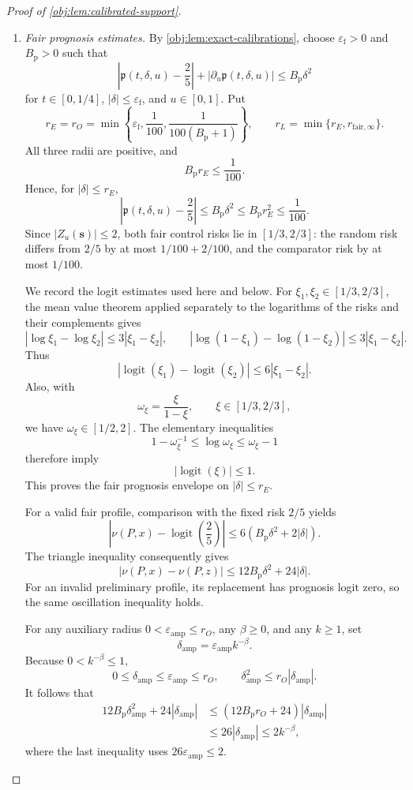 \begin{proof}[Proof of \cref{obj:lem:calibrated-support}]
\begin{enumerate}
\item \textit{Fair prognosis estimates.}
By \cref{obj:lem:exact-calibrations}, choose
\(\varepsilon_{\mathrm f}>0\) and \(B_{\mathrm p}>0\) such that
\[
\left|\mathfrak p(t,\delta,u)-\frac25\right|
+\left|\partial_u\mathfrak p(t,\delta,u)\right|
\le B_{\mathrm p}\delta^2
\]
for \(t\in[0,1/4]\), \(|\delta|\le\varepsilon_{\mathrm f}\), and \(u\in[0,1]\).
Put
\[
r_E=r_O
=\min\left\{\varepsilon_{\mathrm f},\frac1{100},
                    \frac1{100(B_{\mathrm p}+1)}\right\},
\qquad
r_L=\min\{r_E,r_{\mathrm{fair},\infty}\}.
\]
All three radii are positive, and
\[
B_{\mathrm p}r_E\le\frac1{100}.
\]
Hence, for \(|\delta|\le r_E\),
\[
\left|\mathfrak p(t,\delta,u)-\frac25\right|
\le B_{\mathrm p}\delta^2
\le B_{\mathrm p}r_E^2
\le\frac1{100}.
\]
Since \(|Z_u(\mathbf s)|\le2\), both fair control risks lie in
\([1/3,2/3]\): the random risk differs from \(2/5\) by at most
\(1/100+2/100\), and the comparator risk by at most \(1/100\).

We record the logit estimates used here and below. For
\(\xi_1,\xi_2\in[1/3,2/3]\), the mean value theorem applied separately to the logarithms of the risks and their complements gives
\[
|\log \xi_1-\log \xi_2|\le3|\xi_1-\xi_2|,
\qquad
|\log(1-\xi_1)-\log(1-\xi_2)|\le3|\xi_1-\xi_2|.
\]
Thus
\[
|\operatorname{logit}(\xi_1)-\operatorname{logit}(\xi_2)|
\le6|\xi_1-\xi_2|.
\]
Also, with
\[
\omega_\xi=\frac{\xi}{1-\xi},
\qquad \xi\in[1/3,2/3],
\]
we have \(\omega_\xi\in[1/2,2]\). The elementary inequalities
\[
1-\omega_\xi^{-1}\le\log\omega_\xi\le\omega_\xi-1
\]
therefore imply
\[
|\operatorname{logit}(\xi)|\le1.
\]
This proves the fair prognosis envelope on \(|\delta|\le r_E\).

For a valid fair profile, comparison with the fixed risk \(2/5\) yields
\[
\left|\nu(P,x)-\operatorname{logit}\!\left(\frac25\right)\right|
\le6(B_{\mathrm p}\delta^2+2|\delta|).
\]
The triangle inequality consequently gives
\[
|\nu(P,x)-\nu(P,z)|
\le12B_{\mathrm p}\delta^2+24|\delta|.
\]
For an invalid preliminary profile, its replacement has prognosis logit zero, so the same oscillation inequality holds.

For any auxiliary radius \(0<\varepsilon_{\mathrm{amp}}\le r_O\), any
\(\beta\ge0\), and any \(k\ge1\), set
\[
\delta_{\mathrm{amp}}
=\varepsilon_{\mathrm{amp}}k^{-\beta}.
\]
Because \(0<k^{-\beta}\le1\),
\[
0\le\delta_{\mathrm{amp}}\le\varepsilon_{\mathrm{amp}}\le r_O,
\qquad
\delta_{\mathrm{amp}}^2\le r_O|\delta_{\mathrm{amp}}|.
\]
It follows that
\[
\begin{aligned}
12B_{\mathrm p}\delta_{\mathrm{amp}}^2
   +24|\delta_{\mathrm{amp}}|
&\le(12B_{\mathrm p}r_O+24)|\delta_{\mathrm{amp}}|\\
&\le26|\delta_{\mathrm{amp}}|
\le2k^{-\beta},
\end{aligned}
\]
where the last inequality uses \(26\varepsilon_{\mathrm{amp}}\le2\).


\end{enumerate}
\end{proof}

